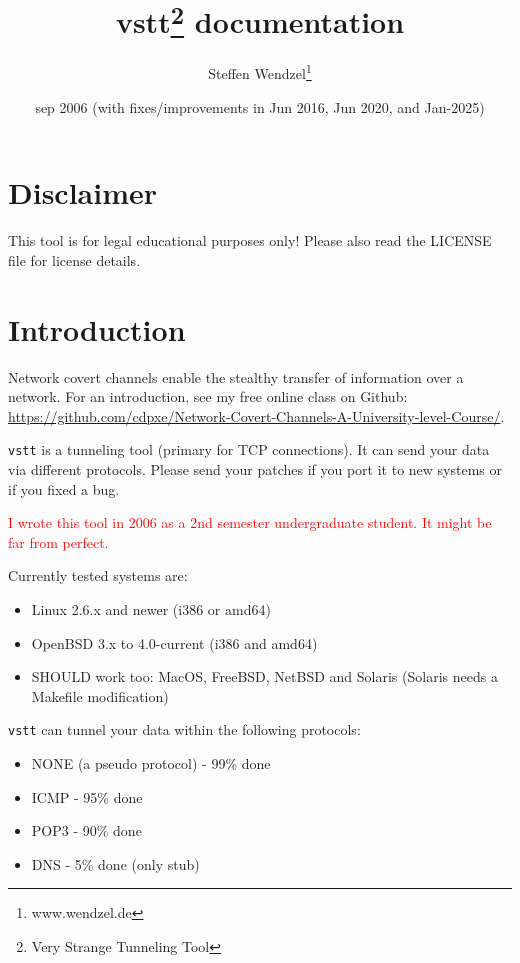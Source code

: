 \documentclass[10pt,a4paper]{article}
\author{Steffen Wendzel\footnote{www.wendzel.de}}
\title{vstt\footnote{Very Strange Tunneling Tool} documentation}
\date{sep 2006 (with fixes/improvements in Jun 2016, Jun 2020, and Jan-2025)}
\makeatletter
\def\maketitle{%
  \null
  \thispagestyle{empty}%
  \vfill
  \begin{center}\leavevmode
    \normalfont
    {\LARGE\raggedleft \@author\par}%
    \hrulefill\par
    {\huge\raggedright \textbf{\@title}\par}%
    \vskip 1cm
  \end{center}%
  \vfill
  \vfill
  \null
  \cleardoublepage
}
\makeatother
\begin{document}
\maketitle
\tableofcontents
\newpage

\section{Disclaimer}

This tool is for legal educational purposes only! Please also read the LICENSE
file for license details.


\section{Introduction}

Network covert channels enable the stealthy transfer of information over a network. For an introduction, see my free online class on Github: \url{https://github.com/cdpxe/Network-Covert-Channels-A-University-level-Course/}.

\texttt{vstt} is a tunneling tool (primary for TCP connections). It can send
your data via different protocols. Please send your patches if you
port it to new systems or if you fixed a bug.

\textcolor{red}{I wrote this tool in 2006 as a 2nd semester undergraduate student. It might be far from perfect.}

Currently tested systems are:

\begin{itemize}
	\item Linux 2.6.x and newer (i386 or amd64)
	\item OpenBSD 3.x to 4.0-current (i386 and amd64)
	\item SHOULD work too: MacOS, FreeBSD, NetBSD and Solaris (Solaris needs a Makefile modification)
\end{itemize}

\texttt{vstt} can tunnel your data within the following protocols:

\begin{itemize}
	\item NONE (a pseudo protocol) - 99\% done
	\item ICMP - 95\% done
	\item POP3 - 90\% done
	\item DNS - 5\% done (only stub)
\end{itemize}
\end{document}
